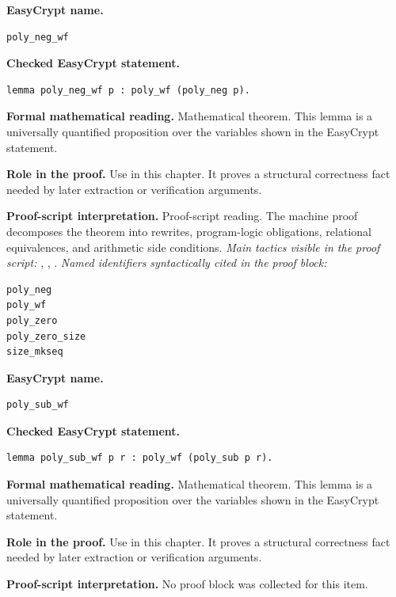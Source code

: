 \begin{formaltheorem}
\noindent\textbf{EasyCrypt name.}
\begin{lstlisting}[language=EasyCrypt,basicstyle=\ttfamily\scriptsize]
poly_neg_wf
\end{lstlisting}
\noindent\textbf{Checked EasyCrypt statement.}
\begin{lstlisting}[language=EasyCrypt,basicstyle=\ttfamily\scriptsize]
lemma poly_neg_wf p : poly_wf (poly_neg p).
\end{lstlisting}
\noindent\textbf{Formal mathematical reading.}
Mathematical theorem. This lemma is a universally quantified proposition over the variables shown in the EasyCrypt statement.

\noindent\textbf{Role in the proof.}
Use in this chapter. It proves a structural correctness fact needed by later extraction or verification arguments.

\noindent\textbf{Proof-script interpretation.}
Proof-script reading. The machine proof decomposes the theorem into rewrites, program-logic obligations, relational equivalences, and arithmetic side conditions.
\emph{Main tactics visible in the proof script:} , , .
\emph{Named identifiers syntactically cited in the proof block:}
\begin{lstlisting}[language=EasyCrypt,basicstyle=\ttfamily\scriptsize]
poly_neg
poly_wf
poly_zero
poly_zero_size
size_mkseq
\end{lstlisting}

\end{formaltheorem}

\begin{formaltheorem}
\noindent\textbf{EasyCrypt name.}
\begin{lstlisting}[language=EasyCrypt,basicstyle=\ttfamily\scriptsize]
poly_sub_wf
\end{lstlisting}
\noindent\textbf{Checked EasyCrypt statement.}
\begin{lstlisting}[language=EasyCrypt,basicstyle=\ttfamily\scriptsize]
lemma poly_sub_wf p r : poly_wf (poly_sub p r).
\end{lstlisting}
\noindent\textbf{Formal mathematical reading.}
Mathematical theorem. This lemma is a universally quantified proposition over the variables shown in the EasyCrypt statement.

\noindent\textbf{Role in the proof.}
Use in this chapter. It proves a structural correctness fact needed by later extraction or verification arguments.

\noindent\textbf{Proof-script interpretation.}
No proof block was collected for this item.

\end{formaltheorem}

